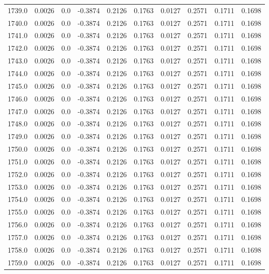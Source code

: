\begin{longtable}{lrrrrrrrrr}
1739.0 & 0.0026 & 0.0 & -0.3874 & 0.2126 & 0.1763 & 0.0127 & 0.2571 & 0.1711 & 0.1698 \\
1740.0 & 0.0026 & 0.0 & -0.3874 & 0.2126 & 0.1763 & 0.0127 & 0.2571 & 0.1711 & 0.1698 \\
1741.0 & 0.0026 & 0.0 & -0.3874 & 0.2126 & 0.1763 & 0.0127 & 0.2571 & 0.1711 & 0.1698 \\
1742.0 & 0.0026 & 0.0 & -0.3874 & 0.2126 & 0.1763 & 0.0127 & 0.2571 & 0.1711 & 0.1698 \\
1743.0 & 0.0026 & 0.0 & -0.3874 & 0.2126 & 0.1763 & 0.0127 & 0.2571 & 0.1711 & 0.1698 \\
1744.0 & 0.0026 & 0.0 & -0.3874 & 0.2126 & 0.1763 & 0.0127 & 0.2571 & 0.1711 & 0.1698 \\
1745.0 & 0.0026 & 0.0 & -0.3874 & 0.2126 & 0.1763 & 0.0127 & 0.2571 & 0.1711 & 0.1698 \\
1746.0 & 0.0026 & 0.0 & -0.3874 & 0.2126 & 0.1763 & 0.0127 & 0.2571 & 0.1711 & 0.1698 \\
1747.0 & 0.0026 & 0.0 & -0.3874 & 0.2126 & 0.1763 & 0.0127 & 0.2571 & 0.1711 & 0.1698 \\
1748.0 & 0.0026 & 0.0 & -0.3874 & 0.2126 & 0.1763 & 0.0127 & 0.2571 & 0.1711 & 0.1698 \\
1749.0 & 0.0026 & 0.0 & -0.3874 & 0.2126 & 0.1763 & 0.0127 & 0.2571 & 0.1711 & 0.1698 \\
1750.0 & 0.0026 & 0.0 & -0.3874 & 0.2126 & 0.1763 & 0.0127 & 0.2571 & 0.1711 & 0.1698 \\
1751.0 & 0.0026 & 0.0 & -0.3874 & 0.2126 & 0.1763 & 0.0127 & 0.2571 & 0.1711 & 0.1698 \\
1752.0 & 0.0026 & 0.0 & -0.3874 & 0.2126 & 0.1763 & 0.0127 & 0.2571 & 0.1711 & 0.1698 \\
1753.0 & 0.0026 & 0.0 & -0.3874 & 0.2126 & 0.1763 & 0.0127 & 0.2571 & 0.1711 & 0.1698 \\
1754.0 & 0.0026 & 0.0 & -0.3874 & 0.2126 & 0.1763 & 0.0127 & 0.2571 & 0.1711 & 0.1698 \\
1755.0 & 0.0026 & 0.0 & -0.3874 & 0.2126 & 0.1763 & 0.0127 & 0.2571 & 0.1711 & 0.1698 \\
1756.0 & 0.0026 & 0.0 & -0.3874 & 0.2126 & 0.1763 & 0.0127 & 0.2571 & 0.1711 & 0.1698 \\
1757.0 & 0.0026 & 0.0 & -0.3874 & 0.2126 & 0.1763 & 0.0127 & 0.2571 & 0.1711 & 0.1698 \\
1758.0 & 0.0026 & 0.0 & -0.3874 & 0.2126 & 0.1763 & 0.0127 & 0.2571 & 0.1711 & 0.1698 \\
1759.0 & 0.0026 & 0.0 & -0.3874 & 0.2126 & 0.1763 & 0.0127 & 0.2571 & 0.1711 & 0.1698 \\

\end{longtable}
